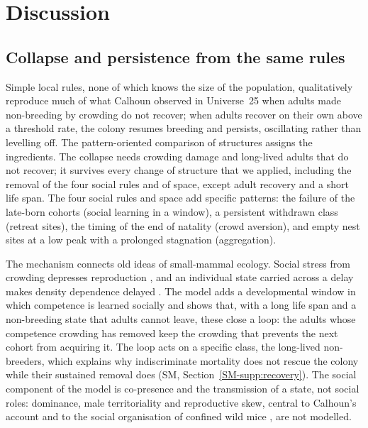 \section{Discussion}
\label{sec:discussion}

\subsection{Collapse and persistence from the same rules}

Simple local rules, none of which knows the size of the population, qualitatively reproduce much of what Calhoun
observed in Universe~25 when adults made non-breeding by crowding do not recover; when adults recover on their own
above a threshold rate, the colony resumes breeding and persists, oscillating rather than levelling off. The
pattern-oriented comparison of structures assigns the ingredients. The collapse needs crowding damage and long-lived
adults that do not recover; it survives every
change of structure that we applied, including the removal of the four social rules and of space, except adult recovery and
a short life span. The four social rules and space add specific patterns: the failure of the
late-born cohorts (social learning in a window), a persistent withdrawn class (retreat sites), the timing of the end
of natality (crowd aversion), and empty nest sites at a low peak with a prolonged stagnation (aggregation).

The mechanism connects old ideas of small-mammal ecology. Social stress from crowding depresses reproduction
\citep{Christian1950}, and an individual state carried across a delay makes density dependence
delayed \citep{GinzburgTaneyhill1994}. The model adds a developmental window in which
competence is learned socially \citep{FawcettFrankenhuis2015,Carcea2021} and shows that, with a long life span and a
non-breeding state that adults cannot leave, these close a loop: the adults whose competence crowding has removed
keep the crowding that prevents the next cohort from acquiring it. The loop acts on a specific class, the long-lived
non-breeders, which explains why indiscriminate mortality does not rescue the colony while their sustained removal
does (SM, Section~\ref{SM-supp:recovery}). The social component of the model is co-presence and
the transmission of a state, not social roles: dominance, male territoriality and reproductive skew, central to
Calhoun's account and to the social organisation of confined wild mice \citep{CrowcroftRowe1963}, are not modelled.


